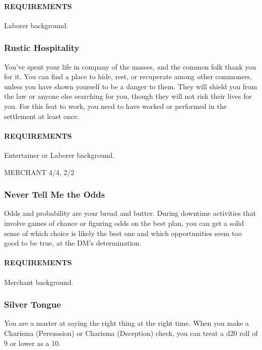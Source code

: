         \paragraph{REQUIREMENTS} Laborer background.

    \subsubsection{Rustic Hospitality} \label{feat::rustichospitality}
        You've spent your life in company of the masses, and the common folk thank you for it.
        You can find a place to hide, rest, or recuperate among other commoners, unless you have shown yourself to be a danger to them.
        They will shield you from the law or anyone else searching for you, though they will not risk their lives for you.
        For this feat to work, you need to have worked or performed in the settlement at least once.
        \paragraph{REQUIREMENTS} Entertainer or Laborer background.

MERCHANT 4/4, 2/2
    \subsubsection{Never Tell Me the Odds} \label{feat::nevertellmetheodds}
        Odds and probability are your bread and butter.
        During downtime activities that involve games of chance or figuring odds on the best plan, you can get a solid sense of which choice is likely the best one and which opportunities seem too good to be true, at the DM's determination.
        \paragraph{REQUIREMENTS} Merchant background.

    \subsubsection{Silver Tongue} \label{feat::silvertongue}
        You are a master at saying the right thing at the right time.
        When you make a Charisma (Persuasion) or Charisma (Deception) check, you can treat a d20 roll of 9 or lower as a 10.
